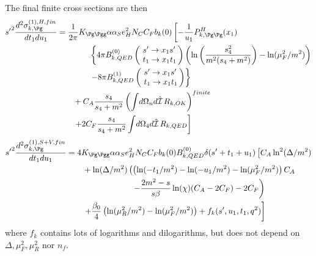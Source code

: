 The final finite cross sections are then
\begin{align}
{s'}^2\frac{d^2\sigma_{k,\Pg}^{(1),H,fin}}{dt_1du_1} &=\frac{1}{2\pi}K_{\Pg\Pgg}\alpha\alpha_Se_H^2N_CC_Fb_k(0)\left[-\frac 1 {u_1}P^H_{k,\Pg\Pg}(x_1)\right. \nonumber\\
 &\hspace{40pt}\left\{4\pi B^{(0)}_{k,QED}\left(\!\begin{array}{l}s'\rightarrow x_1s'\\t_1\rightarrow x_1 t_1\end{array}\!\!\right) \left(\ln\left(\frac{s_4^2}{m^2(s_4+m^2)}\right)-\ln(\mu_F^2/m^2)\right)\right. \nonumber\\
 &\hspace{40pt}\left.-8\pi B^{(1)}_{k,QED}\left(\!\begin{array}{l}s'\rightarrow x_1s'\\t_1\rightarrow x_1 t_1\end{array}\!\!\right)\right\} \nonumber\\
 &\hspace{20pt}+C_A\frac{s_4}{s_4+m^2}\left(\int\!d\Omega_nd\hat{\mathcal I}\,R_{k,OK}\right)^{finite} \nonumber\\
 &\hspace{20pt}\left.+2C_F\frac{s_4}{s_4+m^2}\int\!d\Omega_4d\hat{\mathcal I}\,R_{k,QED}\right]
\end{align}
\begin{align}
{s'}^2\frac{d^2\sigma_{k,\Pg}^{(1),S+V,fin}}{dt_1du_1} &=4K_{\Pg\Pgg}\alpha\alpha_Se_H^2N_CC_Fb_k(0)B^{(0)}_{k,QED}\delta(s'+t_1+u_1)\left[C_A\ln^2(\Delta/m^2) \right.\nonumber\\
 &\hspace{20pt} + \ln(\Delta/m^2)\left(\left(\ln(-t_1/m^2)-\ln(-u_1/m^2)-\ln(\mu_F^2/m^2)\right)C_A \right. \nonumber\\
 &\hspace{80pt} \left. - \frac{2m^2-s}{s\beta}\ln(\chi)(C_A-2C_F) - 2C_F\right) \nonumber\\
 &\hspace{20pt}\left. + \frac {\beta_0}{4}\left(\ln(\mu_R^2/m^2)- \ln(\mu_F^2/m^2)\right) +  f_k(s',u_1,t_1,q^2)\right]
\end{align}
where $f_k$ contains lots of logarithms and dilogarithms, but does not depend on $\Delta,\mu_F^2,\mu_R^2$ nor $n_f$.
